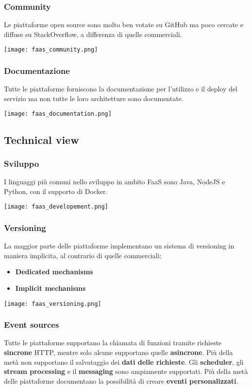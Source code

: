 \subsubsection{Community}
Le piattaforme open source sono molto ben votate su GitHub ma poco cercate e diffuse su StackOverflow, a differenza di quelle commerciali.
\begin{center}
	\texttt{[image: faas\_community.png]}
\end{center}
\subsubsection{Documentazione}
Tutte le piattaforme forniscono la documentazione per l'utilizzo e il deploy del servizio ma non tutte le loro architetture sono documentate.
\begin{center}
	\texttt{[image: faas\_documentation.png]}
\end{center}
\subsection{Technical view}
\subsubsection{Sviluppo}
I linguaggi più comuni nello sviluppo in ambito FaaS sono Java, NodeJS e Python, con il supporto di Docker.
\begin{center}
	\texttt{[image: faas\_developement.png]}
\end{center}
\subsubsection{Versioning}
La maggior parte delle piattaforme implementano un sistema di versioning in maniera implicita, al contrario di quelle commerciali:
\begin{itemize}
	\item \textbf{Dedicated mechanisms}
	\item \textbf{Implicit mechanisms}
\end{itemize}
\begin{center}
	\texttt{[image: faas\_versioning.png]}
\end{center}
\subsubsection{Event sources}
Tutte le piattaforme supportano la chiamata di funzioni tramite richieste \textbf{sincrone} HTTP, mentre solo alcune supportano quelle \textbf{asincrone}. Più della metà non supportano il salvataggio dei \textbf{dati delle richieste}. Gli \textbf{scheduler}, gli \textbf{stream processing} e il \textbf{messaging} sono ampiamente supportati. Più della metà delle piattaforme documentano la possibilità di creare \textbf{eventi personalizzati}.
\newpage
